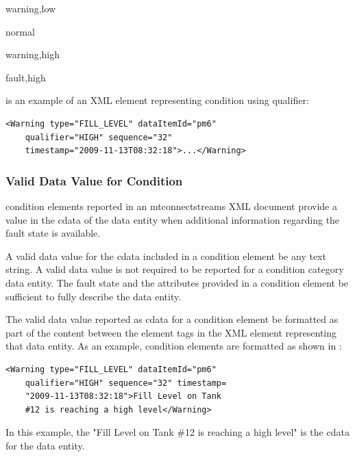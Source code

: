 \documentclass{mtconnect}	%
\begin{document}
\quad \gls{warning},\gls{low}

\quad \gls{normal}

\quad \gls{warning},\gls{high}

\quad \gls{fault},\gls{high}

 is an example of an XML element representing \gls{condition} using \gls{qualifier}:

\begin{lstlisting}[firstnumber=1,escapechar=|,%
    caption={Example of a Condition Element using qualifier},label={lst:example-of-condition-using-qualifier}]
<Warning type="FILL_LEVEL" dataItemId="pm6" 
    qualifier="HIGH" sequence="32" 
    timestamp="2009-11-13T08:32:18">...</Warning>
\end{lstlisting}

\subsubsection{Valid Data Value for Condition}

\gls{condition} elements reported in an \gls{mtconnectstreams} XML document \may provide a value in the \gls{cdata} of the \gls{data entity} when additional information regarding the \gls{fault state} is available.

A \gls{valid data value} for the \gls{cdata} included in a \gls{condition} element \may be any text string.   A \gls{valid data value} is not required to be reported for a \gls{condition} category \gls{data entity}.  The \gls{fault state} and the attributes provided in a \gls{condition} element \may be sufficient to fully describe the \gls{data entity}.

The \gls{valid data value} reported as \gls{cdata} for a \gls{condition} element \must be formatted as part of the content between the element tags in the XML element representing that \gls{data entity}.  As an example, \gls{condition} elements are formatted as shown in :

\begin{lstlisting}[firstnumber=1,escapechar=|,%
    caption={Example of CDATA for Condition},label={lst:example-of-cdata-for-condition}]
<Warning type="FILL_LEVEL" dataItemId="pm6" 
    qualifier="HIGH" sequence="32" timestamp=
    "2009-11-13T08:32:18">Fill Level on Tank
    #12 is reaching a high level</Warning>
\end{lstlisting}

In this example, the "Fill Level on Tank \#12 is reaching a high level" is the \gls{cdata} for the \gls{data entity}.
\end{document}
